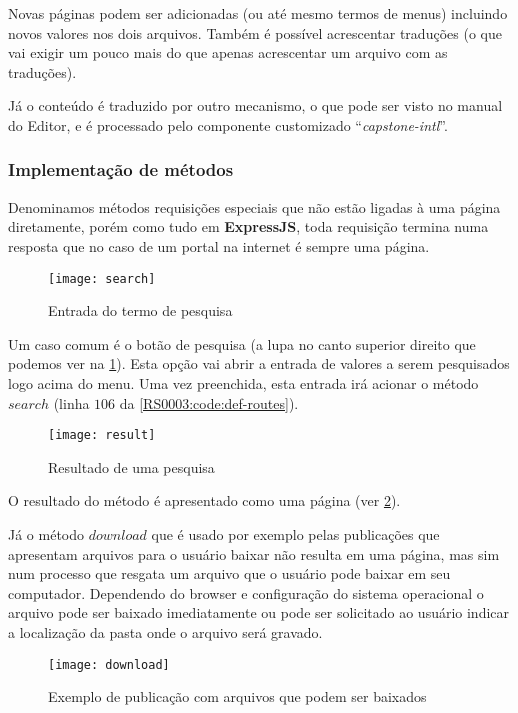 Novas páginas podem ser adicionadas (ou até mesmo termos de menus) incluindo novos valores nos dois arquivos. Também é possível acrescentar traduções (o que vai exigir um pouco mais do que apenas acrescentar um arquivo com as traduções).

Já o conteúdo é traduzido por outro mecanismo, o que pode ser visto no manual do Editor, e é processado pelo componente customizado ``\textit{capstone-intl}''.

\subsubsection{Implementação de métodos}

Denominamos métodos requisições especiais que não estão ligadas à uma página diretamente, porém como tudo em \textbf{ExpressJS}, toda requisição termina numa resposta que no caso de um portal na internet é sempre uma página.

\begin{figure}[!ht]
    \centering
    \texttt{[image: search]}
    \caption{Entrada do termo de pesquisa}\label{RS0003:fig:search}
\end{figure}

Um caso comum é o botão de pesquisa (a lupa no canto superior direito que podemos ver na \cref{RS0003:fig:search}). Esta opção vai abrir a entrada de valores a serem pesquisados logo acima do menu. Uma vez preenchida, esta entrada irá acionar o método $search$ (linha $106$ da \cref{RS0003:code:def-routes}).

\begin{figure}[!ht]
    \centering
    \texttt{[image: result]}
    \caption{Resultado de uma pesquisa}\label{RS0003:fig:result}
\end{figure}

O resultado do método é apresentado como uma página (ver \cref{RS0003:fig:result}).

Já o método $download$ que é usado por exemplo pelas publicações que apresentam arquivos para o usuário baixar não resulta em uma página, mas sim num processo que resgata um arquivo que o usuário pode baixar em seu computador. Dependendo do browser e configuração do sistema operacional o arquivo pode ser baixado imediatamente ou pode ser solicitado ao usuário indicar a localização da pasta onde o arquivo será gravado.

\begin{figure}[!ht]
    \centering
    \texttt{[image: download]}
    \caption{Exemplo de publicação com arquivos que podem ser baixados}\label{RS0003:fig:download}
\end{figure}

